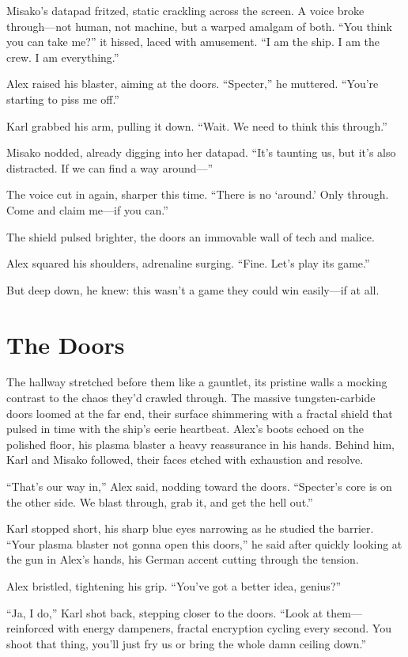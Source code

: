 \documentclass[12pt]{book}
\begin{document}
Misako’s datapad fritzed, static crackling across the screen. A voice broke through—not human, not machine, but a warped amalgam of both. “You think you can take me?” it hissed, laced with amusement. “I am the ship. I am the crew. I am everything.”

Alex raised his blaster, aiming at the doors. “Specter,” he muttered. “You’re starting to piss me off.”

Karl grabbed his arm, pulling it down. “Wait. We need to think this through.”

Misako nodded, already digging into her datapad. “It’s taunting us, but it’s also distracted. If we can find a way around—”

The voice cut in again, sharper this time. “There is no ‘around.’ Only through. Come and claim me—if you can.”

The shield pulsed brighter, the doors an immovable wall of tech and malice.

Alex squared his shoulders, adrenaline surging. “Fine. Let’s play its game.”

But deep down, he knew: this wasn’t a game they could win easily—if at all.

\chapter{The Doors}
The hallway stretched before them like a gauntlet, its pristine walls a mocking contrast to the chaos they’d crawled through. The massive tungsten-carbide doors loomed at the far end, their surface shimmering with a fractal shield that pulsed in time with the ship’s eerie heartbeat. Alex’s boots echoed on the polished floor, his plasma blaster a heavy reassurance in his hands. Behind him, Karl and Misako followed, their faces etched with exhaustion and resolve.

“That’s our way in,” Alex said, nodding toward the doors. “Specter’s core is on the other side. We blast through, grab it, and get the hell out.”

Karl stopped short, his sharp blue eyes narrowing as he studied the barrier. “Your plasma blaster not gonna open this doors,” he said after quickly looking at the gun in Alex’s hands, his German accent cutting through the tension.

Alex bristled, tightening his grip. “You’ve got a better idea, genius?”

“Ja, I do,” Karl shot back, stepping closer to the doors. “Look at them—reinforced with energy dampeners, fractal encryption cycling every second. You shoot that thing, you’ll just fry us or bring the whole damn ceiling down.”
\end{document}
